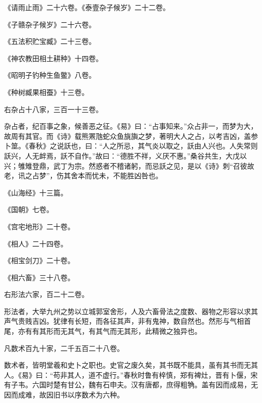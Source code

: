 \documentclass[12pt,UTF8]{ctexbook}
\begin{document}
《请雨止雨》二十六卷。《泰壹杂子候岁》二十二卷。



《子赣杂子候岁》二十六卷。



《五法积贮宝臧》二十三卷。



《神农教田相土耕种》十四卷。



《昭明子钓种生鱼鳖》八卷。



《种树臧果相蚕》十三卷。



右杂占十八家，三百一十三卷。



杂占者，纪百事之象，候善恶之征。《易》曰：“占事知来。”众占非一，而梦为大，故周有其官。而《诗》载熊罴虺蛇众鱼旐旟之梦，著明大人之占，以考吉凶，盖参卜筮。《春秋》之说訞也，曰：“人之所忌，其气炎以取之，訞由人兴也。人失常则訞兴，人无衅焉，訞不自作。”故曰：“德胜不祥，义厌不惠。”桑谷共生，大戊以兴；雊雉登鼎，武丁为宗。然惑者不稽诸躬，而忌訞之见，是以《诗》刺“召彼故老，讯之占梦”，伤其舍本而忧未，不能胜凶咎也。



《山海经》十三篇。



《国朝》七卷。



《宫宅地形》二十卷。



《相人》二十四卷。



《相宝剑刀》二十卷。



《相六畜》三十八卷。



右形法六家，百二十二卷。



形法者，大举九州之势以立城郭室舍形，人及六畜骨法之度数、器物之形容以求其声气贵贱吉凶。犹律有长短，而各征其声，非有鬼神，数自然也。然形与气相首尾，亦有有其形而无其气，有其气而无其形，此精微之独异也。



凡数术百九十家，二千五百二十八卷。



数术者，皆明堂羲和史卜之职也。史官之废久矣，其书既不能具，虽有其书而无其人。《易》曰：“苟非其人，道不虚行。”春秋时鲁有梓慎，郑有裨灶，晋有卜偃，宋有子韦。六国时楚有甘公，魏有石申夫。汉有唐都，庶得粗觕。盖有因而成易，无因而成难，故因旧书以序数术为六种。
\end{document}
